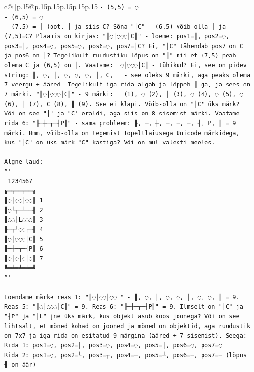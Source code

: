 \documentclass{article}
\begin{document}
{\begin{supertabular}{c@{$\;$}|p{.15\linewidth}@{}p{.15\linewidth}p{.15\linewidth}p{.15\linewidth}p{.15\linewidth}p{.15\linewidth}}
{{{\texttt{{-} (5,5) = ◌} \\
\texttt{{-} (6,5) = ◌} \\
\texttt{{-} (7,5) = │ (oot, │ ja siis C? Sõna "│C" {-} (6,5) võib olla │ ja (7,5)=C? Plaanis on kirjas: "║◌│◌◌◌│C║" {-} loeme: pos1=║, pos2=◌, pos3=│, pos4=◌, pos5=◌, pos6=◌, pos7=│C? Ei, "│C" tähendab pos7 on C ja pos6 on │? Tegelikult ruudustiku lõpus on "║" nii et (7,5) peab olema C ja (6,5) on │. Vaatame: ║◌│◌◌◌│C║ {-} tühikud? Ei, see on pidev string: ║, ◌, │, ◌, ◌, ◌, │, C, ║ {-} see oleks 9 märki, aga peaks olema 7 veergu + ääred. Tegelikult iga rida algab ja lõppeb ║{-}ga, ja sees on 7 märki. "║◌│◌◌◌│C║" {-} 9 märki: ║ (1), ◌ (2), │ (3), ◌ (4), ◌ (5), ◌ (6), │ (7), C (8), ║ (9). See ei klapi. Võib{-}olla on "│C" üks märk? Või on see "│" ja "C" eraldi, aga siis on 8 sisemist märki. Vaatame rida 6: "╟─┼─┬─┤P║" {-} sama probleem: ╟, ─, ┼, ─, ┬, ─, ┤, P, ║ = 9 märki. Hmm, võib{-}olla on tegemist topeltlaiusega Unicode märkidega, kus "│C" on üks märk "C" kastiga? Või on mul valesti meeles.} \\
\\ 
\texttt{Algne laud:} \\
\texttt{```} \\
\texttt{ 1234567} \\
\texttt{╔═╤══╤══╗} \\
\texttt{║◌│◌◌│◌◌║ 1} \\
\texttt{║◌└┬─┴──╢ 2} \\
\texttt{║◌◌│L◌◌◌║ 3} \\
\texttt{╟─┬┘◌◌┌─╢ 4} \\
\texttt{║◌│◌◌◌│C║ 5} \\
\texttt{╟─┼─┬─┤P║ 6} \\
\texttt{║◌│◌│◌│◌║ 7} \\
\texttt{╚═╧═╧═╧═╝} \\
\texttt{```} \\
\\ 
\texttt{Loendame märke reas 1: "║◌│◌◌│◌◌║" {-} ║, ◌, │, ◌, ◌, │, ◌, ◌, ║ = 9. Reas 5: "║◌│◌◌◌│C║" = 9. Reas 6: "╟─┼─┬─┤P║" = 9. Ilmselt on "│C" ja "┤P" ja "│L" jne üks märk, kus objekt asub koos joonega? Või on see lihtsalt, et mõned kohad on jooned ja mõned on objektid, aga ruudustik on 7x7 ja iga rida on esitatud 9 märgina (ääred + 7 sisemist). Seega:} \\
\texttt{Rida 1: pos1=◌, pos2=│, pos3=◌, pos4=◌, pos5=│, pos6=◌, pos7=◌} \\
\texttt{Rida 2: pos1=◌, pos2=└, pos3=┬, pos4=─, pos5=┴, pos6=─, pos7=─ (lõpus ╢ on äär)} \\
}}}
\end{supertabular}}
\end{document}
